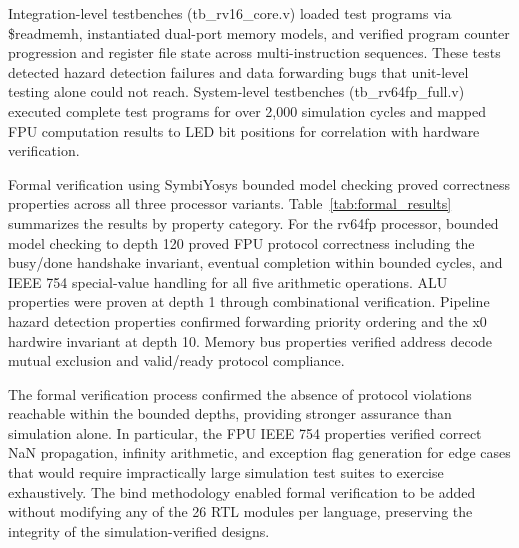 \documentclass[journal]{IEEEtran}
\begin{document}
Integration-level testbenches (tb\_rv16\_core.v) loaded test programs via \$readmemh, instantiated dual-port memory models, and verified program counter progression and register file state across multi-instruction sequences. These tests detected hazard detection failures and data forwarding bugs that unit-level testing alone could not reach. System-level testbenches (tb\_rv64fp\_full.v) executed complete test programs for over 2,000 simulation cycles and mapped FPU computation results to LED bit positions for correlation with hardware verification.

Formal verification using SymbiYosys bounded model checking proved correctness properties across all three processor variants. Table~\ref{tab:formal_results} summarizes the results by property category. For the rv64fp processor, bounded model checking to depth 120 proved FPU protocol correctness including the busy/done handshake invariant, eventual completion within bounded cycles, and IEEE 754 special-value handling for all five arithmetic operations. ALU properties were proven at depth 1 through combinational verification. Pipeline hazard detection properties confirmed forwarding priority ordering and the x0 hardwire invariant at depth 10. Memory bus properties verified address decode mutual exclusion and valid/ready protocol compliance.

The formal verification process confirmed the absence of protocol violations reachable within the bounded depths, providing stronger assurance than simulation alone. In particular, the FPU IEEE 754 properties verified correct NaN propagation, infinity arithmetic, and exception flag generation for edge cases that would require impractically large simulation test suites to exercise exhaustively. The bind methodology enabled formal verification to be added without modifying any of the 26 RTL modules per language, preserving the integrity of the simulation-verified designs.

\begin{table}[!t]
\caption{Formal Verification Results by Property Category}
\label{tab:formal_results}
\centering
{}
\end{table}
\end{document}
